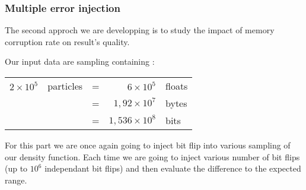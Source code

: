 \documentclass[10pt,a4paper,twoside,twocolumn]{article}
\newcommand*{\rootPath}{../}
\begin{document}
\subsubsection{Multiple error injection}

The second approch we are developping is to study the impact of memory
corruption rate on result's quality.

Our input data are sampling containing :
\begin{table}[h]
	\centering
	\begin{tabular}{rlcrl}
		$2\times10^5$	& particles	&=	& $6\times10^5$			& floats	\\
									&						&= 	& $1,92\times10^7$	& bytes		\\
									&						&= 	& $1,536\times10^8$	& bits
	\end{tabular}
\end{table}

For this part we are once again going to inject bit flip into various sampling
of our density function. Each time we are going to inject various number of bit
flips (up to $10^6$ independant bit flips) and then evaluate the difference to
the expected range.

\ifstandalone
	
	
\fi
\end{document}

